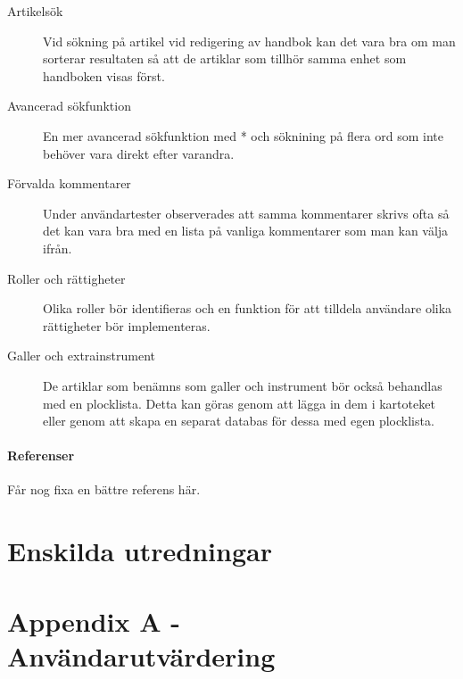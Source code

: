 \documentclass{article}
\begin{document}
\begin{description}
\item[Artikelsök] Vid sökning på artikel vid redigering av handbok kan det vara bra om man sorterar resultaten så att de artiklar som tillhör samma enhet som handboken visas först.
\item[Avancerad sökfunktion] En mer avancerad sökfunktion med * och söknining på flera ord som inte behöver vara direkt efter varandra.
\item[Förvalda kommentarer] Under användartester observerades att samma kommentarer skrivs ofta så det kan vara bra med en lista på vanliga kommentarer som man kan välja ifrån.
\item[Roller och rättigheter] Olika roller bör identifieras och en funktion för att tilldela användare olika rättigheter bör implementeras.
\item[Galler och extrainstrument] De artiklar som benämns som galler och instrument bör också behandlas med en plocklista. Detta kan göras genom att lägga in dem i kartoteket eller genom att skapa en separat databas för dessa med egen plocklista.
\end{description}
\subsection{Referenser}
\begin{thebibliography}{9}
Får nog fixa en bättre referens här.
\end{thebibliography}

\newpage
\part{Enskilda utredningar}
\renewcommand{\thesection}{\Alph{section}}	

\newpage

\newpage

\newpage

\newpage

\newpage

\newpage

\newpage

\part{Appendix A - Användarutvärdering}

\end{document}
